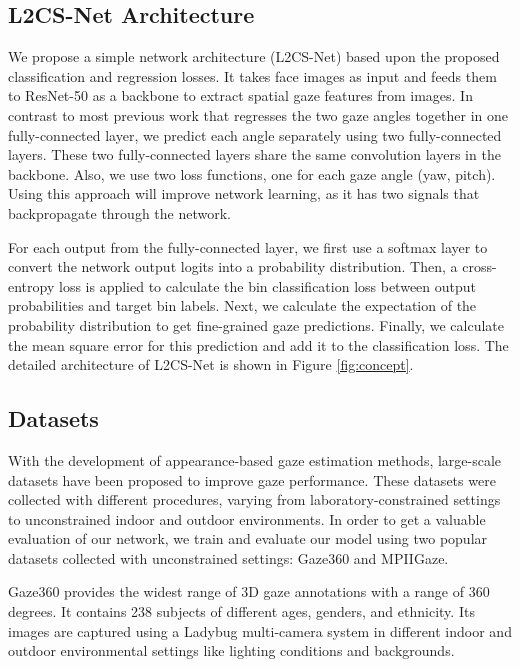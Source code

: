 \documentclass{article}
\begin{document}
\subsection{L2CS-Net Architecture}
We propose a simple network architecture (L2CS-Net) based upon the proposed classification and regression losses. It takes face images as input and feeds them to ResNet-50 as a backbone to extract spatial gaze features from images. In contrast to most previous work that regresses the two gaze angles together in one fully-connected layer, we predict each angle separately using two fully-connected layers. These two fully-connected layers share the same convolution layers in the backbone. Also, we use two loss functions, one for each gaze angle (yaw, pitch). Using this approach will improve network learning, as it has two signals that backpropagate through the network.

For each output from the fully-connected layer, we first use a softmax layer to convert the network output logits into a probability distribution. Then, a cross-entropy loss is applied to calculate the bin classification loss between output probabilities and target bin labels. Next, we calculate the expectation of the probability distribution to get fine-grained gaze predictions. Finally, we calculate the mean square error for this prediction and add it to the classification loss. The detailed architecture of L2CS-Net is shown in Figure \ref{fig:concept}.

\subsection{Datasets}

With the development of appearance-based gaze estimation methods, 
large-scale datasets have been proposed to improve gaze performance. These datasets were collected with different procedures, varying from laboratory-constrained settings to unconstrained indoor and outdoor environments. In order to get a valuable evaluation of our network, we train and evaluate our model using two popular datasets collected with unconstrained settings: Gaze360 and MPIIGaze.

Gaze360 \cite{Gaze360} provides the widest range of 3D gaze annotations with a range of 360 degrees. It contains 238 subjects of different ages, genders, and ethnicity. Its images are captured using a Ladybug multi-camera system in different indoor and outdoor environmental settings like lighting conditions and backgrounds.
\end{document}
